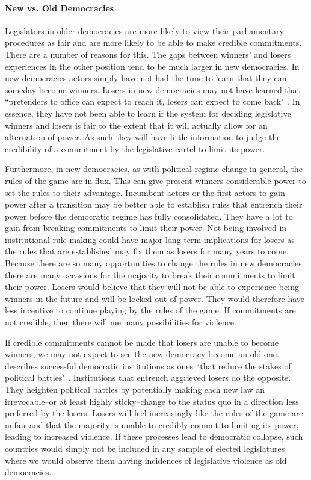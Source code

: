 \documentclass[a4paper]{article}\usepackage[]{graphicx}\usepackage[]{color}
\begin{document}
\paragraph{New vs. Old Democracies}

Legislators in older democracies are more likely to view their parliamentary procedures as fair and are more likely to be able to make credible commitments. There are a number of reasons for this. The gaps between winners' and losers' experiences in the other position tend to be much larger in new democracies. In new democracies actors simply have not had the time to learn that they can someday become winners. Losers in new democracies may not have learned that ``pretenders to office can expect to reach it, losers can expect to come back" \citep[][36]{Przeworski1991}. In essence, they have not been able to learn if the system for deciding legislative winners and losers is fair to the extent that it will actually allow for an alternation of power. As such they will have little information to judge the credibility of a commitment by the legislative cartel to limit its power.

Furthermore, in new democracies, as with political regime change in general, the rules of the game are in flux. This can give present winners considerable power to set the rules to their advantage. Incumbent actors or the first actors to gain power after a transition may be better able to establish rules that entrench their power \cite[108]{Saideman2002} before the democratic regime has fully consolidated. They have a lot to gain from breaking commitments to limit their power. Not being involved in institutional rule-making could have major long-term implications for losers as the rules that are established may fix them as losers for many years to come. Because there are so many opportunities to change the rules in new democracies there are many occasions for the majority to break their commitments to limit their power. Losers would believe that they will not be able to experience being winners in the future and will be locked out of power. They would therefore have less incentive to continue playing by the rules of the game. If commitments are not credible, then there will me many possibilities for violence. 

If credible commitments cannot be made that losers are unable to become winners, we may not expect to see the new democracy become an old one. \citeauthor{Przeworski1991} describes successful democratic institutions as ones ``that reduce the stakes of political battles" \citeyearpar[][36]{Przeworski1991}. Institutions that entrench aggrieved losers do the opposite. They heighten political battles by potentially making each new law an irrevocable--or at least highly sticky--change to the status quo in a direction less preferred by the losers. Losers will feel increasingly like the rules of the game are unfair and that the majority is unable to credibly commit to limiting its power, leading to increased violence. If these processes lead to democratic collapse, such countries would simply not be included in any sample of elected legislatures where we would observe them having incidences of legislative violence as old democracies.
\end{document}
